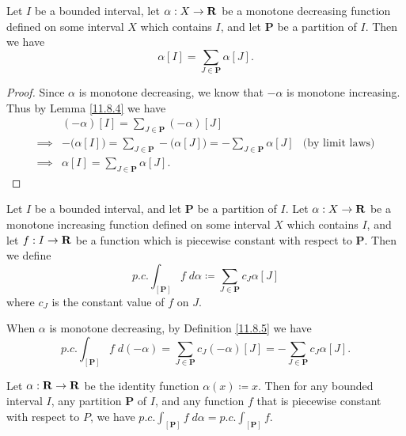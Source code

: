 \begin{additional corollary}\label{ac 11.8.3}
Let \(I\) be a bounded interval, let \(\alpha : X \to \mathbf{R}\) be a monotone decreasing function defined on some interval \(X\) which contains \(I\), and let \(\mathbf{P}\) be a partition of \(I\).
Then we have
\[
    \alpha[I] = \sum_{J \in \mathbf{P}} \alpha[J].
\]
\end{additional corollary}

\begin{proof}
    Since \(\alpha\) is monotone decreasing, we know that \(-\alpha\) is monotone increasing.
    Thus by Lemma \ref{11.8.4} we have
    \begin{align*}
                 & (-\alpha)[I] = \sum_{J \in \mathbf{P}} (-\alpha)[J]                                                                               \\
        \implies & -\big(\alpha[I]\big) = \sum_{J \in \mathbf{P}} -\big(\alpha[J]\big) = -\sum_{J \in \mathbf{P}} \alpha[J] & \text{(by limit laws)} \\
        \implies & \alpha[I] = \sum_{J \in \mathbf{P}} \alpha[J].
    \end{align*}
\end{proof}

\begin{definition}\label{11.8.5}
    Let \(I\) be a bounded interval, and let \(\mathbf{P}\) be a partition of \(I\).
    Let \(\alpha : X \to \mathbf{R}\) be a monotone increasing function defined on some interval \(X\) which contains \(I\), and let \(f : I \to \mathbf{R}\) be a function which is piecewise constant with respect to \(\mathbf{P}\).
    Then we define
    \[
        p.c. \int_{[\mathbf{P}]} f \; d \alpha \coloneqq \sum_{J \in \mathbf{P}} c_J \alpha[J]
    \]
    where \(c_J\) is the constant value of \(f\) on \(J\).
\end{definition}

\begin{note}
    When \(\alpha\) is monotone decreasing, by Definition \ref{11.8.5} we have
    \[
        p.c. \int_{[\mathbf{P}]} f \; d (-\alpha) = \sum_{J \in \mathbf{P}} c_J (-\alpha)[J] = - \sum_{J \in \mathbf{P}} c_J \alpha[J].
    \]
\end{note}

\setcounter{theorem}{6}
\begin{example}\label{11.8.7}
    Let \(\alpha : \mathbf{R} \to \mathbf{R}\) be the identity function \(\alpha(x) \coloneqq x\).
    Then for any bounded interval \(I\), any partition \(\mathbf{P}\) of \(I\), and any function \(f\) that is piecewise constant with respect to \(P\), we have \(p.c. \int_{[\mathbf{P}]} f \; d \alpha = p.c. \int_{[\mathbf{P}]} f\).
\end{example}

